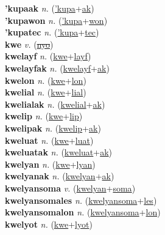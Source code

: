 \textbf{'kupaak} \textit{n.} (\hyperref['kupa]{'kupa}+\hyperref[ak]{ak})
 \label{'kupaak} \\
\textbf{'kupawon} \textit{n.} (\hyperref['kupa]{'kupa}+\hyperref[won]{won})
 \label{'kupawon} \\
\textbf{'kupatec} \textit{n.} (\hyperref['kupa]{'kupa}+\hyperref[tec]{tec})
 \label{'kupatec} \\
\textbf{kwe} \textit{v.} (\hyperref[nyo]{\sout{nyo}})
 \label{kwe} \\
\textbf{kwelayf} \textit{n.} (\hyperref[kwe]{kwe}+\hyperref[layf]{layf})
 \label{kwelayf} \\
\textbf{kwelayfak} \textit{n.} (\hyperref[kwelayf]{kwelayf}+\hyperref[ak]{ak})
 \label{kwelayfak} \\
\textbf{kwelon} \textit{n.} (\hyperref[kwe]{kwe}+\hyperref[lon]{lon})
 \label{kwelon} \\
\textbf{kwelial} \textit{n.} (\hyperref[kwe]{kwe}+\hyperref[lial]{lial})
 \label{kwelial} \\
\textbf{kwelialak} \textit{n.} (\hyperref[kwelial]{kwelial}+\hyperref[ak]{ak})
 \label{kwelialak} \\
\textbf{kwelip} \textit{n.} (\hyperref[kwe]{kwe}+\hyperref[lip]{lip})
 \label{kwelip} \\
\textbf{kwelipak} \textit{n.} (\hyperref[kwelip]{kwelip}+\hyperref[ak]{ak})
 \label{kwelipak} \\
\textbf{kweluat} \textit{n.} (\hyperref[kwe]{kwe}+\hyperref[luat]{luat})
 \label{kweluat} \\
\textbf{kweluatak} \textit{n.} (\hyperref[kweluat]{kweluat}+\hyperref[ak]{ak})
 \label{kweluatak} \\
\textbf{kwelyan} \textit{n.} (\hyperref[kwe]{kwe}+\hyperref[lyan]{lyan})
 \label{kwelyan} \\
\textbf{kwelyanak} \textit{n.} (\hyperref[kwelyan]{kwelyan}+\hyperref[ak]{ak})
 \label{kwelyanak} \\
\textbf{kwelyansoma} \textit{v.} (\hyperref[kwelyan]{kwelyan}+\hyperref[soma]{soma})
 \label{kwelyansoma} \\
\textbf{kwelyansomales} \textit{n.} (\hyperref[kwelyansoma]{kwelyansoma}+\hyperref[les]{les})
 \label{kwelyansomales} \\
\textbf{kwelyansomalon} \textit{n.} (\hyperref[kwelyansoma]{kwelyansoma}+\hyperref[lon]{lon})
 \label{kwelyansomalon} \\
\textbf{kwelyot} \textit{n.} (\hyperref[kwe]{kwe}+\hyperref[lyot]{lyot})
 \label{kwelyot} \\
